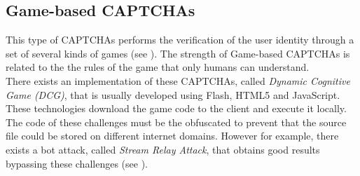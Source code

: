 \subsection{Game-based CAPTCHAs}
This type of CAPTCHAs performs the verification of the user identity through a set of several kinds of games (see ). The strength of Game-based CAPTCHAs is related to the the rules of the game that only humans can understand.\\
There exists an implementation of these CAPTCHAs, called \textit{Dynamic Cognitive Game (DCG)}, that is usually developed using Flash, HTML5 and JavaScript. These technologies download the game code to the client and execute it locally.\\
The code of these challenges must be the obfuscated to prevent that the source file could be stored on different internet domains. However for example, there exists a bot attack, called \textit{Stream Relay Attack}, that obtains good results bypassing these challenges \cite{game_CAPTCHA} (see ).
